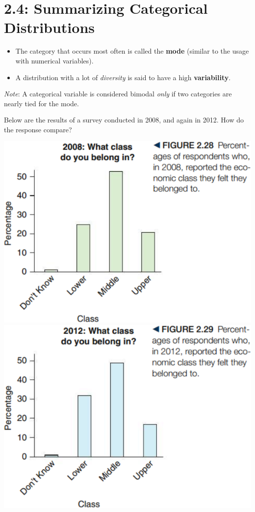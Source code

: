 \documentclass[../mathNotesPreamble]{subfiles}
\begin{document}
  \section{2.4: Summarizing Categorical Distributions}
  \begin{defn*}
    \begin{itemize}
      \item The category that occurs most often is called the \textbf{mode} (similar to the usage with numerical variables).
      \item A distribution with a lot of \emph{diversity} is said to have a high \textbf{variability}.
    \end{itemize}
  \end{defn*}

  \emph{Note}: A categorical variable is considered bimodal \emph{only} if two categories are nearly tied for the mode.
  \vspace*{\baselineskip}

  \begin{ex*}
    Below are the results of a survey conducted in 2008, and again in 2012. How do the response compare?
  \end{ex*}

  \begin{center}
    \includegraphics[width=0.425\linewidth]{images/math211_figure_2p28}
    \includegraphics[width=0.425\linewidth]{images/math211_figure_2p29}
  \end{center}
  \pagebreak
\end{document}
